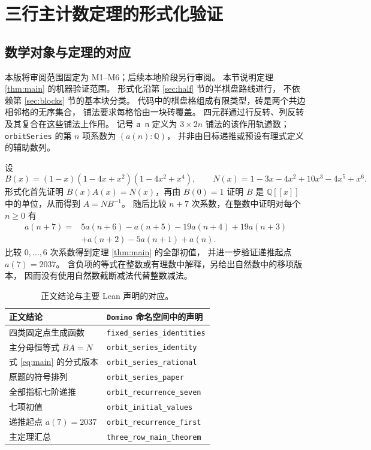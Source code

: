 \section{三行主计数定理的形式化验证}\label{sec:formalization}

\subsection{数学对象与定理的对应}
本版将审阅范围固定为 M1--M6；后续本地阶段另行审阅。
本节说明定理 \ref{thm:main} 的机器验证范围。
形式化沿第 \ref{sec:half} 节的半棋盘路线进行，
不依赖第 \ref{sec:blocks} 节的基本块分类。
代码中的棋盘格组成有限类型，砖是两个共边相邻格的无序集合，
铺法要求每格恰由一块砖覆盖。
四元群通过行反转、列反转及其复合在这些铺法上作用。
记号 \texttt{a n} 定义为 $3\times2n$ 铺法的该作用轨道数；
\texttt{orbitSeries} 的第 $n$ 项系数为 $(a(n):\mathbb Q)$，
并非由目标递推或预设有理式定义的辅助数列。

设
\[
 B(x)=(1-x)(1-4x+x^2)(1-4x^2+x^4),\qquad
 N(x)=1-3x-4x^2+10x^3-4x^5+x^6.
\]
形式化首先证明 $B(x)A(x)=N(x)$，再由 $B(0)=1$ 证明 $B$ 是
$\mathbb Q[[x]]$ 中的单位，从而得到 $A=NB^{-1}$。
随后比较 $n+7$ 次系数，在整数中证明对每个 $n\ge0$ 有
\[
\begin{split}
 a(n+7)={}&5a(n+6)-a(n+5)-19a(n+4)+19a(n+3)\\
          &+a(n+2)-5a(n+1)+a(n).
\end{split}
\]
比较 $0,\ldots,6$ 次系数得到定理 \ref{thm:main} 的全部初值，
并进一步验证递推起点 $a(7)=2037$。
含负项的等式在整数或有理数中解释，另给出自然数中的移项版本，
因而没有使用自然数截断减法代替整数减法。

\begin{table}[htbp]
\centering
\caption{正文结论与主要 Lean 声明的对应。}\label{tab:lean}
\small
\begin{tabular}{ll}
\toprule
正文结论 & \texttt{Domino} 命名空间中的声明\\
\midrule
四类固定点生成函数 & \texttt{fixed\_series\_identities}\\
主分母恒等式 $BA=N$ & \texttt{orbit\_series\_identity}\\
式 \eqref{eq:main} 的分式版本 & \texttt{orbit\_series\_rational}\\
原题的符号排列 & \texttt{orbit\_series\_paper}\\
全部指标七阶递推 & \texttt{orbit\_recurrence\_seven}\\
七项初值 & \texttt{orbit\_initial\_values}\\
递推起点 $a(7)=2037$ & \texttt{orbit\_recurrence\_first}\\
主定理汇总 & \texttt{three\_row\_main\_theorem}\\
\bottomrule
\end{tabular}
\end{table}

